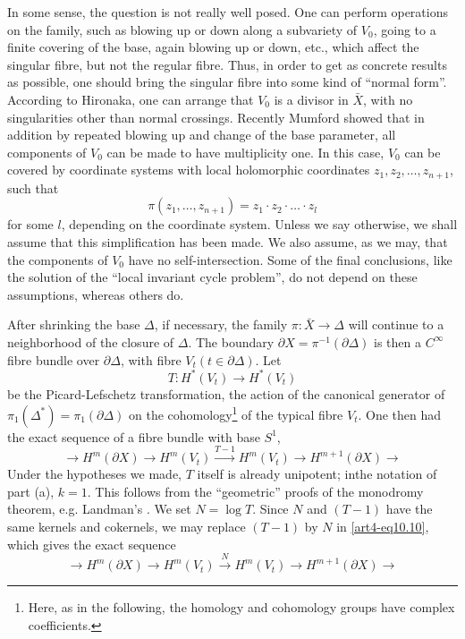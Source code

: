In some sense, the question is not really well posed. One can perform operations on the family, such as blowing up or down along a subvariety of $V_0$, going to a finite covering of the base, again blowing up or down, etc., which affect the singular fibre, but not the regular fibre. Thus, in order to get as concrete results as possible, one should bring the singular fibre into some kind of ``normal form''. According to Hironaka, one can arrange that $V_0$ is a divisor in $\bar{X}$, with no singularities other than normal crossings. Recently Mumford showed that in addition by repeated blowing up and change of the base parameter, all components of $V_0$ can be made to have multiplicity one. In this case, $V_0$ can be covered by coordinate systems with local holomorphic coordinates $z_1, z_2, \ldots, z_{n+1}$, such that
$$
\pi(z_1, \ldots, z_{n+1}) = z_1 \cdot z_2 \cdot \ldots \cdot z_l
$$
for some $l$, depending on the coordinate system. Unless we say otherwise, we shall assume that this simplification has been made. We also assume, as we may, that the components of $V_0$ have no self-intersection. Some of the final conclusions, like the solution of the ``local invariant cycle problem'', do not depend on these assumptions, whereas others do.

After shrinking the base $\Delta$, if necessary, the family $\pi : \bar{X} \to \Delta$ will continue to a neighborhood of the closure of $\Delta$. The boundary $\partial X = \pi^{-1} (\partial \Delta)$ is then a $C^\infty$ fibre bundle over $\partial \Delta$, with fibre $V_t (t \in \partial \Delta)$. Let 
$$
T : H^\ast (V_t ) \longrightarrow H^\ast (V_t)
$$
be the Picard-Lefschetz transformation, \ie the action of the canonical generator of $\pi_1 (\Delta^\ast) = \pi_1 (\partial\Delta)$ on the cohomology\footnote[43]{Here, as in the following, the homology and cohomology groups have complex coefficients.} of the typical fibre $V_t$. One then had the exact sequence of a fibre bundle with base $S^1$,
\begin{equation}\label{art4-eq10.10}
\longrightarrow H^m (\partial X) \longrightarrow H^m (V_t) \xrightarrow{T - 1} H^m (V_t) \longrightarrow  H^{m+1} (\partial X) \longrightarrow  
\end{equation}\pageoriginale
Under the hypotheses we made, $T$ itself is already unipotent; inthe notation of part (a), $k=1$. This follows from the ``geometric'' proofs of the monodromy theorem, e.g. Landman's \cite{art4-key35}. We set $N = \log T$. Since $N$ and $(T -1)$ have the same kernels and cokernels, we may replace $(T-1)$ by $N$ in \eqref{art4-eq10.10}, which gives the exact sequence
\begin{equation}\label{art4-eq10.11}
\longrightarrow H^m (\partial X) \longrightarrow H^m (V_t) \xrightarrow{N} H^m (V_t) \longrightarrow  H^{m+1} (\partial X) \longrightarrow  
\end{equation}

